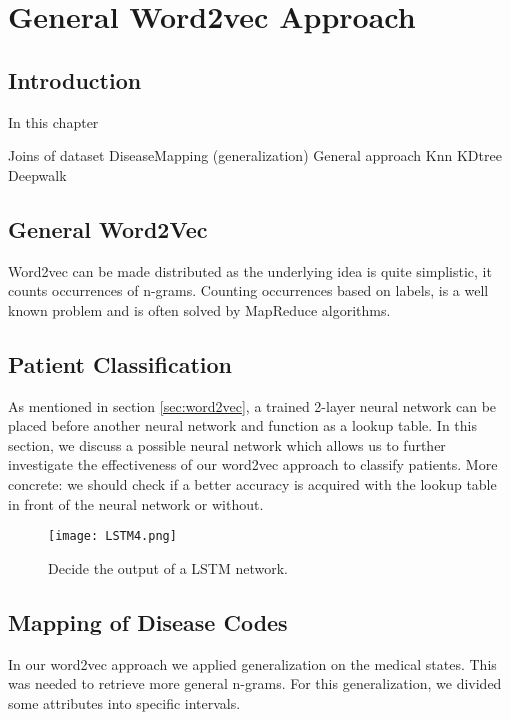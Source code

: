 \graphicspath{ {Approach/Images/} }


\chapter{General Word2vec Approach}
\label{cha:approach}

\section{Introduction}
In this chapter 

Joins of dataset
DiseaseMapping (generalization)
General approach 
Knn
KDtree
Deepwalk





\section{General Word2Vec}

Word2vec can be made distributed as the underlying idea is quite simplistic, it counts occurrences of n-grams. Counting occurrences based on labels, is a well known problem and is often solved by MapReduce algorithms. 


\section{Patient Classification}

As mentioned in section \ref{sec:word2vec}, a trained 2-layer neural network can be placed before another neural network and function as a lookup table. In this section, we discuss a possible neural network which allows us to further investigate the effectiveness of our word2vec approach to classify patients. More concrete: we should check if a better accuracy is acquired with the lookup table in front of the neural network or without. 


\begin{figure}[H]
	\centering
	\texttt{[image: LSTM4.png]}
	\caption{Decide the output of a LSTM network.}
	\label{fig:LSTM4}
\end{figure} 


\section{Mapping of Disease Codes}

In our word2vec approach we applied generalization on the medical states. This was needed to retrieve more general n-grams. For this generalization, we divided some attributes into specific intervals.

